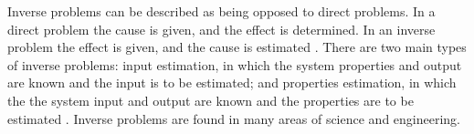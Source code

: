 Inverse problems can be described as being opposed to direct
problems. In a direct problem the cause is given, and the effect is
determined. In an inverse problem the effect is given, and the cause
is estimated \cite{Kirsch1996}. There are two main types of inverse
problems: input estimation, in which the system properties and
output are known and the input is to be estimated; and properties
estimation, in which the the system input and output are known and
the properties are to be estimated \cite{Kirsch1996}. Inverse
problems are found in many areas of science and engineering.

%


